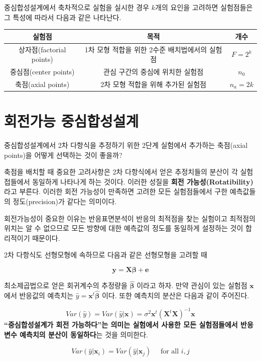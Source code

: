 \documentclass[
]{book}
\newcommand{\bm}[1]{\boldsymbol{\mathbf{#1}}}
\theoremstyle{definition}
\theoremstyle{definition}
\theoremstyle{definition}
\theoremstyle{definition}
\theoremstyle{remark}
\begin{document}
중심합성설계에서 축차적으로 실험을 실시한 경우 \(k\)개의 요인을 고려하면 실험점들은 그 특성에 따라서 다음과 같은 나타난다.

\begin{longtable}[]{@{}ccc@{}}
\toprule
실험점 & 목적 & 개수\tabularnewline
\midrule
\endhead
상자점(factorial points) & 1차 모형 적합을 위한 2수준 배치법에서의 실험점 & \(F=2^k\)\tabularnewline
중심점(center points) & 관심 구간의 중심에 위치한 실험점 & \(n_0\)\tabularnewline
축점(axial points) & 2차 모형 적합을 위해 추가된 실험점 & \(n_a=2k\)\tabularnewline
\bottomrule
\end{longtable}

\hypertarget{uxd68cuxc804uxac00uxb2a5-uxc911uxc2ecuxd569uxc131uxc124uxacc4}{%
\section{회전가능 중심합성설계}\label{uxd68cuxc804uxac00uxb2a5-uxc911uxc2ecuxd569uxc131uxc124uxacc4}}

중심합성설계에서 2차 다항식을 추정하기 위한 2단계 실험에서 추가하는 축점(axial points)을 어떻게
선택하는 것이 좋을까?

축점을 배치할 때 중요한 고려사항은 2차 다항식에서 얻은 추정치들의 분산이 각 실험접들에서 동일하게 나타나게 하는 것이다. 이러한 성질을 \textbf{회전 가능성(Rotatibility)} 라고 부른다. 이러한 회전 가능성이 만족하면 고려한 모든 실험점들에서 구한 예측값들의 정도(precision)가 같다는 의미이다.

회전가능성이 중요한 이유는 반응표면분석이 반응의 최적점을 찾는 실험이고 최적점의 위치는
알 수 없으므로 모든 방향에 대한 예측값의 정도를 동일하게 설정하는 것이 합리적이기 때문이다.

2차 다항식도 선형모형에 속하므로 다음과 같은 선형모형을 고려할 때

\[\bm y = \bm X \bm \beta + \bm e\]

최소제곱법으로 얻은 회귀계수의 추정량을 \(\hat {\bm \beta}\) 이라고 하자. 만약 관심이 있는 실험점 \(\bm x\) 에서 반응값의 예측치는 \(\hat y = {\bm x}^t \hat {\bm \beta}\) 이다. 또한
예측치의 분산은 다음과 같이 주어진다.

\[Var (\hat y) = Var (\hat y|\bm x) = \sigma^2 {\bm x}^t (\bm X^t \bm X)^{-1} {\bm x}\]
\textbf{``중심합성설계가 회전 가능하다''는 의미는 실험에서 사용한 모든 실험점들에서 반응변수 예측치의 분산이 동일하다}는 것을 의미한다.

\begin{equation}
 Var (\hat y|\bm x_i) =   Var (\hat y|\bm x_j)  \quad \text{ for all } i,j
\label{eq:ratate}
\end{equation}
\end{document}
